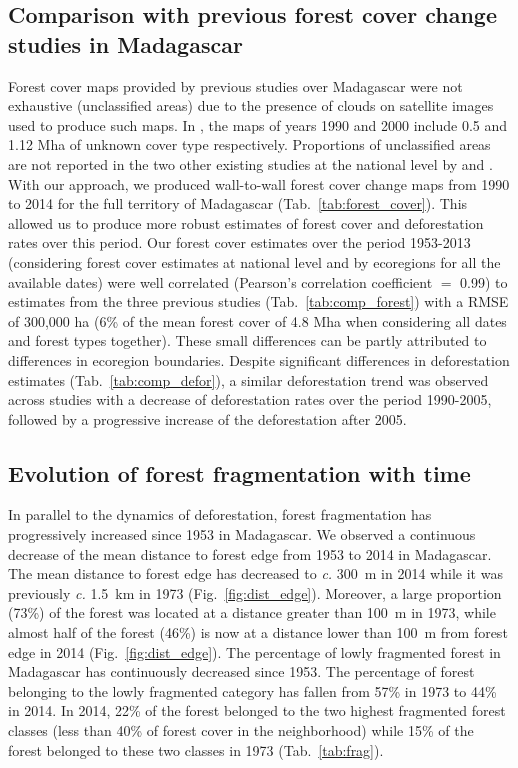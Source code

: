 \documentclass[a4paper, 12pt, leqno]{article}\usepackage[]{graphicx}\usepackage[]{color}
\begin{document}
\subsection{Comparison with previous forest cover change studies
in Madagascar}

Forest cover maps provided by previous studies over Madagascar were
not exhaustive (unclassified areas) due to the presence of clouds on
satellite images used to produce such maps. In \citet{Harper2007}, the
maps of years 1990 and 2000 include 0.5 and 1.12 Mha of unknown cover
type respectively. Proportions of unclassified areas are not reported
in the two other existing studies at the national level by
\citet{MEFT2009} and \citet{ONE2015}. With our approach, we produced
wall-to-wall forest cover change maps from 1990 to 2014 for the full
territory of Madagascar (Tab.~\ref{tab:forest_cover}). This allowed us
to produce more robust estimates of forest cover and deforestation
rates over this period. Our forest cover estimates over the period
1953-2013 (considering forest cover estimates at national level and by
ecoregions for all the available dates) were well correlated
(Pearson's correlation coefficient $=$ 0.99) to estimates from the
three previous studies (Tab.~\ref{tab:comp_forest}) with a RMSE of
300,000 ha (6\% of the mean forest cover of 4.8 Mha when considering
all dates and forest types together). These small differences can be
partly attributed to differences in ecoregion boundaries. Despite
significant differences in deforestation estimates
(Tab.~\ref{tab:comp_defor}), a similar deforestation trend was
observed across studies with a decrease of deforestation rates over
the period 1990-2005, followed by a progressive increase of the
deforestation after 2005.

\subsection{Evolution of forest fragmentation with time}

In parallel to the dynamics of deforestation, forest fragmentation has
progressively increased since 1953 in Madagascar. We observed a
continuous decrease of the mean distance to forest edge from 1953 to
2014 in Madagascar. The mean distance to forest edge has decreased to
\emph{c.} 300~m in 2014 while it was previously \emph{c.} 1.5~km in
1973 (Fig.~\ref{fig:dist_edge}). Moreover, a large proportion (73\%)
of the forest was located at a distance greater than 100~m in 1973,
while almost half of the forest (46\%) is now at a distance lower than
100~m from forest edge in 2014 (Fig.~\ref{fig:dist_edge}). The
percentage of lowly fragmented forest in Madagascar has continuously
decreased since 1953. The percentage of forest belonging to the lowly
fragmented category has fallen from 57\% in 1973 to 44\% in 2014. In
2014, 22\% of the forest belonged to the two highest
fragmented forest classes (less than 40\% of forest cover in the
neighborhood) while 15\% of the forest belonged to these two
classes in 1973 (Tab.~\ref{tab:frag}).
\end{document}
